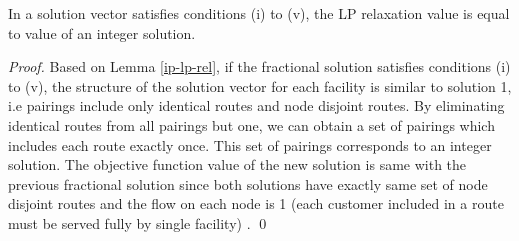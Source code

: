 \begin{lemma}
\label{ip-lp-rel2}
In a solution vector satisfies conditions (i) to (v), the LP relaxation value 
is equal to value of an integer solution.
\end{lemma} 
\begin{proof} 
Based on Lemma \ref{ip-lp-rel}, if the fractional solution satisfies conditions 
(i) to (v),  the structure of the solution vector for each facility is similar to 
solution 1, i.e pairings include only identical routes and node disjoint routes.
By eliminating identical routes from all pairings but one, we can obtain
a set of pairings which includes each route exactly once. This set of pairings
corresponds to an integer solution. The objective function value of the new
solution is same with the previous fractional solution since both solutions
have exactly same set of node disjoint routes and the flow on each node is 1
(each customer included in a route must be served fully by single facility) .
\qed
\end{proof}

